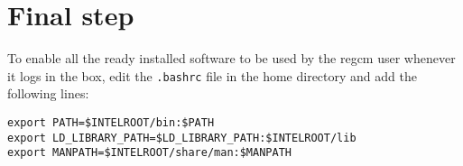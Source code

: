 \section{Final step}

To enable all the ready installed software to be used by the regcm user whenever
it logs in the box, edit the \verb=.bashrc= file in the home directory and add
the following lines:

\begin{Verbatim}
export PATH=$INTELROOT/bin:$PATH
export LD_LIBRARY_PATH=$LD_LIBRARY_PATH:$INTELROOT/lib
export MANPATH=$INTELROOT/share/man:$MANPATH
\end{Verbatim}
